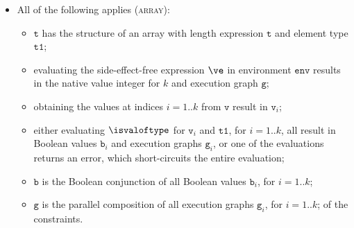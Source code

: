 \documentclass{book}
\newcommand\env[0]{\texttt{env}}
\newcommand\vg[0]{\texttt{g}}
\newcommand\vv[0]{\texttt{v}}
\newcommand\vt[0]{\texttt{t}}
\newcommand\vtone[0]{\texttt{t1}}
\newcommand\vb[0]{\texttt{b}}
\begin{document}
\begin{itemize}
  \item All of the following applies (\textsc{array}):
  \begin{itemize}
    \item $\vt$ has the structure of an array with length expression $\vt$
    and element type $\vtone$;
    \item evaluating the side-effect-free expression $\ve$ in environment $\env$
    results in the native value integer for $k$ and execution graph $\vg$;
    \item obtaining the values at indices $i=1..k$ from $\vv$ result in $\vv_i$;
    \item either evaluating $\isvaloftype$ for $\vv_i$ and $\vtone$, for $i=1..k$,
    all result in Boolean values $\vb_i$ and execution graphs $\vg_i$,
    or one of the evaluations returns an error,
    which short-circuits the entire evaluation;
    \item $\vb$ is the Boolean conjunction of all Boolean values $\vb_i$, for $i=1..k$;
    \item $\vg$ is the parallel composition of all execution graphs $\vg_i$, for $i=1..k$;
    of the constraints.
  \end{itemize}
\end{itemize}

\end{document}
